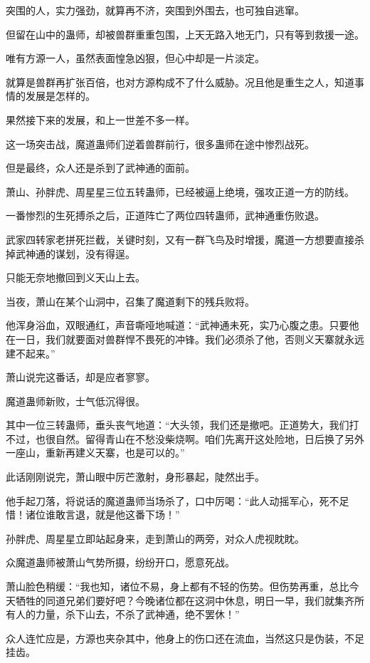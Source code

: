 \begin{this_body}
突围的人，实力强劲，就算再不济，突围到外围去，也可独自逃窜。

但留在山中的蛊师，却被兽群重重包围，上天无路入地无门，只有等到救援一途。

唯有方源一人，虽然表面惶急凶狠，但心中却是一片淡定。

就算是兽群再扩张百倍，也对方源构成不了什么威胁。况且他是重生之人，知道事情的发展是怎样的。

果然接下来的发展，和上一世差不多一样。

这一场突击战，魔道蛊师们逆着兽群前行，很多蛊师在途中惨烈战死。

但是最终，众人还是杀到了武神通的面前。

萧山、孙胖虎、周星星三位五转蛊师，已经被逼上绝境，强攻正道一方的防线。

一番惨烈的生死搏杀之后，正道阵亡了两位四转蛊师，武神通重伤败退。

武家四转家老拼死拦截，关键时刻，又有一群飞鸟及时增援，魔道一方想要直接杀掉武神通的谋划，没有得逞。

只能无奈地撤回到义天山上去。

当夜，萧山在某个山洞中，召集了魔道剩下的残兵败将。

他浑身浴血，双眼通红，声音嘶哑地喊道：“武神通未死，实乃心腹之患。只要他在一日，我们就要面对兽群悍不畏死的冲锋。我们必须杀了他，否则义天寨就永远建不起来。”

萧山说完这番话，却是应者寥寥。

魔道蛊师新败，士气低沉得很。

其中一位三转蛊师，垂头丧气地道：“大头领，我们还是撤吧。正道势大，我们打不过，也很自然。留得青山在不愁没柴烧啊。咱们先离开这处险地，日后换了另外一座山，重新再建义天寨，也是可以的。”

此话刚刚说完，萧山眼中厉芒激射，身形暴起，陡然出手。

他手起刀落，将说话的魔道蛊师当场杀了，口中厉喝：“此人动摇军心，死不足惜！诸位谁敢言退，就是他这番下场！”

孙胖虎、周星星立即站起身来，走到萧山的两旁，对众人虎视眈眈。

众魔道蛊师被萧山气势所摄，纷纷开口，愿意死战。

萧山脸色稍缓：“我也知，诸位不易，身上都有不轻的伤势。但伤势再重，总比今天牺牲的同道兄弟们要好吧？今晚诸位都在这洞中休息，明日一早，我们就集齐所有人的力量，杀下山去，不杀了武神通，绝不罢休！”

众人连忙应是，方源也夹杂其中，他身上的伤口还在流血，当然这只是伪装，不足挂齿。


\end{this_body}
